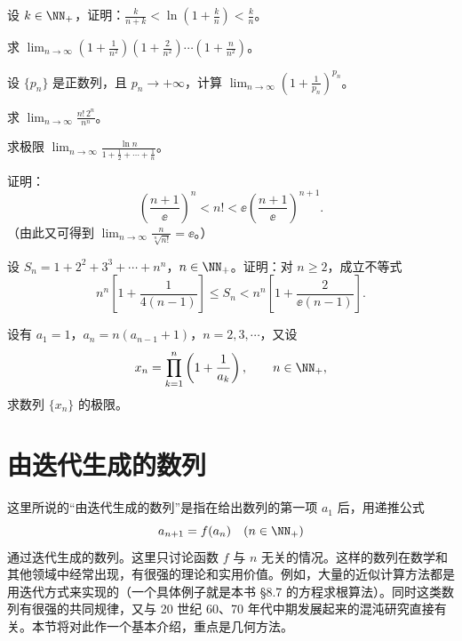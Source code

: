 \begin{xexercise}[2]
设 $k\in\NN_+$，证明：$\displaystyle\frac{k}{n+k}<\ln\left(1+\frac kn\right)<\frac kn$。
\end{xexercise}

\begin{xexercise}[3]
求 $\displaystyle\lim_{n\to\infty}\left(1+\frac1{n^2}\right)\left(1+\frac2{n^2}\right)\cdots\left(1+\frac n{n^2}\right)$。
\end{xexercise}

\begin{xexercise}[4]
设 $\{p_n\}$ 是正数列，且 $p_n\to+\infty$，计算 $\displaystyle\lim_{n\to\infty}\left(1+\frac1{p_n}\right)^{p_n}$。
\end{xexercise}

\begin{xexercise}[5]
求 $\displaystyle\lim_{n\to\infty}\frac{n!\,2^n}{n^n}$。
\end{xexercise}

\begin{xexercise}[6]
求极限 $\displaystyle\lim_{n\to\infty}\frac{\ln n}{1+\frac12+\cdots+\frac1n}$。
\end{xexercise}

\begin{xexercise}[7]
证明：
  \[
    \left(\frac{n+1}{\ee}\right)^n<n!<\ee\left(\frac{n+1}{\ee}\right)^{n+1}.
  \]
  （由此又可得到 $\displaystyle\lim_{n\to\infty}\frac n{\sqrt[n]{n!}}=\ee$。）
\end{xexercise}

\begin{xexercise}[8]
设 $S_n=1+2^2+3^3+\cdots+n^n$，$n\in\NN_+$。证明：对 $n\ge2$，成立不等式
  \[
    n^n\left[1+\frac1{4(n-1)}\right]\le S_n
    <n^n\left[1+\frac2{\ee(n-1)}\right].
  \]
\end{xexercise}

\begin{xexercise}[9]
设有 $a_1=1$，$a_n=n(a_{n-1}+1)$，$n=2,3,\cdots$，又设
  \[
    x_n=\prod_{k=1}^n\left(1+\frac1{a_k}\right),\qquad n\in\NN_+,
  \]
  求数列 $\{x_n\}$ 的极限。
\end{xexercise}

\section{由迭代生成的数列}

这里所说的“由迭代生成的数列”是指在给出数列的第一项 $a_1$ 后，用递推公式
\[
  a_{n+1}=f(a_n)\quad(n\in\NN_+)
\]
通过迭代生成的数列。这里只讨论函数 $f$ 与 $n$ 无关的情况。这样的数列在数学和其他领域中经常出现，有很强的理论和实用价值。例如，大量的近似计算方法都是用迭代方式来实现的（一个具体例子就是本书 §8.7 的方程求根算法）。同时这类数列有很强的共同规律，又与 20 世纪 60、70 年代中期发展起来的混沌研究直接有关。本节将对此作一个基本介绍，重点是几何方法。

